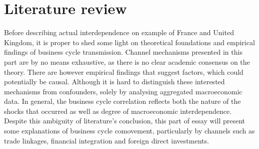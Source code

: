 \documentclass{article}
\begin{document}
\section*{Literature review}

Before describing actual interdependence on example of France and United Kingdom, it is proper to shed some light on theoretical foundations and empirical findings of business cycle transmission. Channel mechanisms presented in this part are by no means exhaustive, as there is no clear academic consensus on the theory. There are however empirical findings that suggest factors, which could potentially be causal. Although it is hard to distinguish these interested mechanisms from confounders, solely by analysing aggregated macroeconomic data. In general, the business cycle correlation reflects both the nature of the shocks that occurred as well as degree of macroeconomic interdependence. Despite this ambiguity of literature's conclusion, this part of essay will present some explanations of business cycle comovement, particularly by channels such as trade linkages, financial integration and foreign direct investments.
\end{document}
